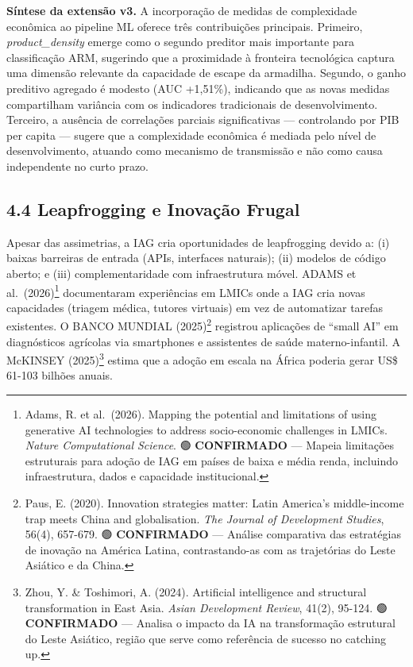 \documentclass[
  brazilian,
  12pt,
]{article}
\begin{document}
\textbf{Síntese da extensão v3.} A incorporação de medidas de complexidade econômica ao pipeline ML oferece três contribuições principais. Primeiro, \emph{product\_density} emerge como o segundo preditor mais importante para classificação ARM, sugerindo que a proximidade à fronteira tecnológica captura uma dimensão relevante da capacidade de escape da armadilha. Segundo, o ganho preditivo agregado é modesto (AUC +1,51\%), indicando que as novas medidas compartilham variância com os indicadores tradicionais de desenvolvimento. Terceiro, a ausência de correlações parciais significativas --- controlando por PIB per capita --- sugere que a complexidade econômica é mediada pelo nível de desenvolvimento, atuando como mecanismo de transmissão e não como causa independente no curto prazo.

\subsection{4.4 Leapfrogging e Inovação Frugal}\label{leapfrogging-e-inovauxe7uxe3o-frugal}

Apesar das assimetrias, a IAG cria oportunidades de leapfrogging devido a: (i) baixas barreiras de entrada (APIs, interfaces naturais); (ii) modelos de código aberto; e (iii) complementaridade com infraestrutura móvel. ADAMS et al.~(2026)\footnote{Adams, R. et al.~(2026). Mapping the potential and limitations of using generative AI technologies to address socio-economic challenges in LMICs. \emph{Nature Computational Science}. 🟢 \textbf{CONFIRMADO} --- Mapeia limitações estruturais para adoção de IAG em países de baixa e média renda, incluindo infraestrutura, dados e capacidade institucional.} documentaram experiências em LMICs onde a IAG cria novas capacidades (triagem médica, tutores virtuais) em vez de automatizar tarefas existentes. O BANCO MUNDIAL (2025)\footnote{Paus, E. (2020). Innovation strategies matter: Latin America's middle-income trap meets China and globalisation. \emph{The Journal of Development Studies}, 56(4), 657-679. 🟢 \textbf{CONFIRMADO} --- Análise comparativa das estratégias de inovação na América Latina, contrastando-as com as trajetórias do Leste Asiático e da China.} registrou aplicações de ``small AI'' em diagnósticos agrícolas via smartphones e assistentes de saúde materno-infantil. A McKINSEY (2025)\footnote{Zhou, Y. \& Toshimori, A. (2024). Artificial intelligence and structural transformation in East Asia. \emph{Asian Development Review}, 41(2), 95-124. 🟢 \textbf{CONFIRMADO} --- Analisa o impacto da IA na transformação estrutural do Leste Asiático, região que serve como referência de sucesso no catching up.} estima que a adoção em escala na África poderia gerar US\$ 61-103 bilhões anuais.
\end{document}
